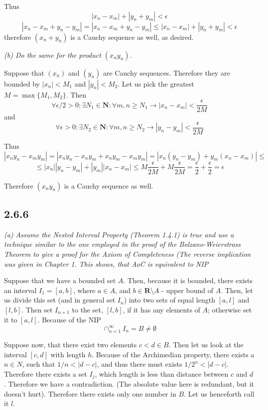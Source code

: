 \documentclass[11pt,oneside,titlepage]{book}
\begin{document}
Thus
$$|x_n - x_m| + |y_n + y_m| < \epsilon$$
$$|x_n - x_m + y_n - y_m | = |x_n - x_m + y_n - y_m| \leq |x_n - x_m| + |y_n + y_m| < \epsilon$$
therefore $(x_n + y_n)$ is a Cauchy sequence as well, as desired.

\textit{(b) Do the same for the product $(x_n y_n)$.}

Suppose that $(x_n)$ and $(y_n)$ are Cauchy sequences. Therefore
they are bounded by $|x_n| < M_1$ and $|y_n| < M_2$. Let us pick the
greatest $M = \max\{M_1, M_2\}$. Then
$$\forall \epsilon/2 > 0: \exists N_1 \in \textbf{N}: \forall m,n \geq N_1 \to
|x_n - x_m| < \frac{\epsilon}{2M}$$
and
$$\forall \epsilon > 0: \exists N_2 \in \textbf{N}: \forall m,n \geq N_2 \to
|y_n - y_m| < \frac{\epsilon}{2M}$$

Thus 
$$|x_n y_n - x_m y_m| = |x_n y_n - x_n y_m + x_n y_m - x_m y_m | =
|x_n (y_n - y_m) +  y_m( x_n - x_m) | \leq$$
$$ \leq |x_n||y_n - y_m| + |y_m| |x_n - x_m| \leq M \frac{\epsilon}{2M} +
M \frac{\epsilon}{2M} = \frac{\epsilon}{2} + \frac{\epsilon}{2} = \epsilon$$

Therefore $(x_n y_n)$ is a Cauchy sequence as well.

\subsection*{2.6.6}

\textit{(a) Assume the Nested Interval Property (Theorem 1.4.1) is true and
  use a technique similar to the one employed in the proof of the
  Bolzano-Weierstrass Theorem to give a proof for the Axiom of Completeness
  (The reverse implication was given in Chapter 1. This shows, that AoC is
  equivalent to NIP}

Suppose that we have a bounded set $A$. Then, because it is bounded, there
exists an interval $I_1 = [a, b]$, where $a \in A$, and
$b \in \textbf{R} \setminus A$ - upper bound of $A$. Then, let us
divide this set (and in general set $I_n$) into two sets of equal
length $[a, l]$ and $[l, b]$.
Then set $I_{n + 1}$ to the set, $[l, b]$, if it has any elements of $A$;
otherwise set it to $[a, l]$. Because of the NIP
$$\cap_{n = 1}^{\infty} I_n  = B\neq \emptyset$$

Suppose now, that there exist two elements $c < d \in B$. Then let us
look at the interval $[c, d]$ with length $h$. Because of the Archimedian
property, there exists a $n \in N$, such that $1/n < |d - c|$, and thus
there must exists $1/2^n < |d - c|$. Therefore there exists a set $I_j$, which
length is less than distance between $c$ and $d$. Therefore we
have a contradiction. (The absolute value here is redundant, but it doesn't
hurt). Therefore there exists only one number in $B$. Let us henceforth call
it $l$.
\end{document}

